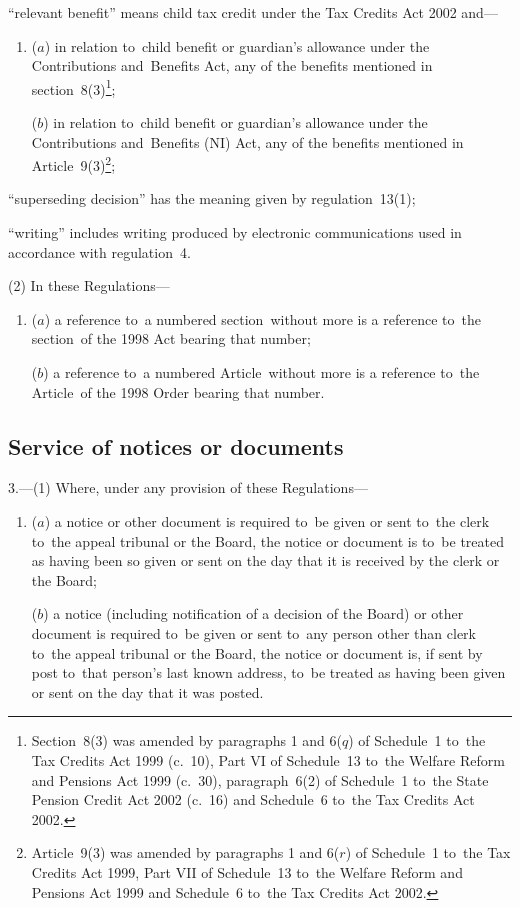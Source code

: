 \documentclass[12pt,a4paper]{article}
\begin{document}
\begin{enumerate}
“relevant benefit” means child tax credit under the Tax Credits Act 2002 and—
\begin{enumerate}\item[]
($a$) 
in relation to~child benefit or guardian’s allowance under the Contributions and~Benefits Act, any of the benefits mentioned in section~8(3)\footnote{Section~8(3) was amended by paragraphs 1 and 6($q$)  of Schedule~1 to~the Tax Credits Act 1999 (c.~10), Part VI of Schedule~13 to~the Welfare Reform and Pensions Act 1999 (c.~30), paragraph~6(2) of Schedule~1 to~the State Pension Credit Act 2002 (c.~16) and Schedule~6 to~the Tax Credits Act 2002.};

($b$) 
in relation to~child benefit or guardian’s allowance under the Contributions and~Benefits (NI) Act, any of the benefits mentioned in Article~9(3)\footnote{Article~9(3) was amended by paragraphs 1 and 6($r$)  of Schedule~1 to~the Tax Credits Act 1999, Part VII of Schedule~13 to~the Welfare Reform and Pensions Act 1999 and Schedule~6 to~the Tax Credits Act 2002.};
\end{enumerate}

“superseding decision” has the meaning given by regulation~13(1);

“writing” includes writing produced by electronic communications used in accordance with regulation~4.
\end{enumerate}

(2) In these Regulations—
\begin{enumerate}\item[]
($a$) a reference to~a numbered section~without more is a reference to~the section~of the 1998 Act bearing that number;

($b$) a reference to~a numbered Article~without more is a reference to~the Article~of the 1998 Order bearing that number.
\end{enumerate}

\subsection[3. Service of notices or documents]{Service of notices or documents}

3.---(1)  Where, under any provision of these Regulations—
\begin{enumerate}\item[]
($a$) a notice or other document is required to~be given or sent to~the clerk to~the appeal tribunal or the Board, the notice or document is to~be treated as having been so given or sent on the day that it is received by the clerk or the Board;

($b$) a notice (including notification of a decision of the Board) or other document is required to~be given or sent to~any person other than clerk to~the appeal tribunal or the Board, the notice or document is, if sent by post to~that person’s last known address, to~be treated as having been given or sent on the day that it was posted.
\end{enumerate}
\end{document}
